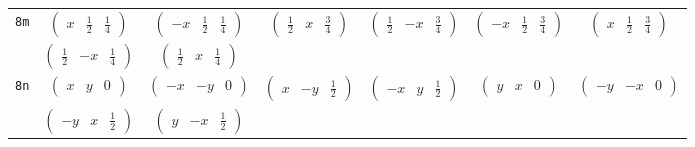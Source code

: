\documentclass[fleqn,9pt,landscape]{jsarticle}
\begin{document}
\begin{center}
\begin{longtable}{ccccccc}
{\tt 8m} & $ \begin{pmatrix} x & \frac{1}{2} & \frac{1}{4} \end{pmatrix} $ & $ \begin{pmatrix} - x & \frac{1}{2} & \frac{1}{4} \end{pmatrix} $ & $ \begin{pmatrix} \frac{1}{2} & x & \frac{3}{4} \end{pmatrix} $ & $ \begin{pmatrix} \frac{1}{2} & - x & \frac{3}{4} \end{pmatrix} $ & $ \begin{pmatrix} - x & \frac{1}{2} & \frac{3}{4} \end{pmatrix} $ & $ \begin{pmatrix} x & \frac{1}{2} & \frac{3}{4} \end{pmatrix} $ \\
& $ \begin{pmatrix} \frac{1}{2} & - x & \frac{1}{4} \end{pmatrix} $ & $ \begin{pmatrix} \frac{1}{2} & x & \frac{1}{4} \end{pmatrix} $ & $  $ & $  $ & $  $ & $  $ \\ \hline
{\tt 8n} & $ \begin{pmatrix} x & y & 0 \end{pmatrix} $ & $ \begin{pmatrix} - x & - y & 0 \end{pmatrix} $ & $ \begin{pmatrix} x & - y & \frac{1}{2} \end{pmatrix} $ & $ \begin{pmatrix} - x & y & \frac{1}{2} \end{pmatrix} $ & $ \begin{pmatrix} y & x & 0 \end{pmatrix} $ & $ \begin{pmatrix} - y & - x & 0 \end{pmatrix} $ \\
& $ \begin{pmatrix} - y & x & \frac{1}{2} \end{pmatrix} $ & $ \begin{pmatrix} y & - x & \frac{1}{2} \end{pmatrix} $ & $  $ & $  $ & $  $ & $  $ \\ \hline

\end{longtable}
\end{center}
\end{document}
